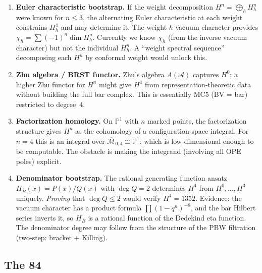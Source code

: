 \documentclass[11pt]{article}
\newcommand{\cA}{\mathcal{A}}
\newcommand{\cM}{\mathcal{M}}
\newcommand{\B}{\bar{B}}
\newcommand{\bP}{\mathbb{P}}
\begin{document}
\begin{enumerate}[label=(\roman*)]
\item \textbf{Euler characteristic bootstrap.}
  If the weight decomposition $H^n = \bigoplus_h H^n_h$ were known
  for $n \leq 3$, the alternating Euler characteristic at each weight
  constrains $H^4_h$ and may determine it.  The weight-$h$ vacuum
  character provides $\chi_h = \sum (-1)^n \dim H^n_h$.  Currently
  we know $\chi_h$ (from the inverse vacuum character) but not the
  individual $H^n_h$.  A ``weight spectral sequence'' decomposing
  each $H^n$ by conformal weight would unlock this.

\item \textbf{Zhu algebra / BRST functor.}
  Zhu's algebra $A(\cA)$ captures $H^0$; a higher Zhu functor for
  $H^n$ might give $H^4$ from representation-theoretic data without
  building the full bar complex.  This is essentially MC5 (BV = bar)
  restricted to degree~$4$.

\item \textbf{Factorization homology.}
  On $\bP^1$ with $n$ marked points, the factorization structure
  gives $H^n$ as the cohomology of a configuration-space integral.
  For $n=4$ this is an integral over $\overline{\cM}_{0,4} \cong \bP^1$,
  which is low-dimensional enough to be computable.  The obstacle is
  making the integrand (involving all OPE poles) explicit.

\item \textbf{Denominator bootstrap.}
  The rational generating function ansatz
  $H_{\B}(x) = P(x)/Q(x)$ with $\deg Q = 2$ determines $H^4$ from
  $H^0,\ldots,H^3$ uniquely.  \emph{Proving} that $\deg Q \leq 2$
  would verify $H^4 = 1352$.  Evidence: the vacuum character has a
  product formula $\prod(1-q^n)^{-8}$, and the bar Hilbert series
  inverts it, so $H_{\B}$ is a rational function of the Dedekind
  eta function.  The denominator degree may follow from the structure
  of the PBW filtration (two-step: bracket + Killing).
\end{enumerate}

\subsection{The 84}
\end{document}
